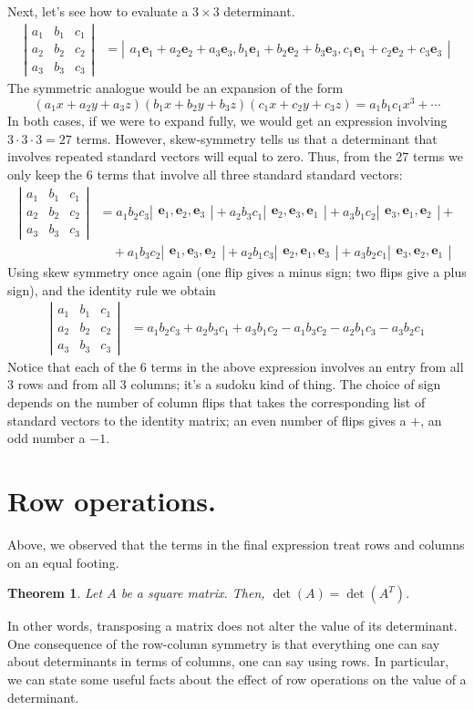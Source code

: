 \documentclass[12pt]{article}
\newcommand{\be}{\mathbf{e}}
\newcommand{\vmat}[1]{\left|\begin{matrix}#1\end{matrix}\right|}
\newtheorem{theorem}{Theorem}
\begin{document}
Next, let's see how to evaluate a $3\times 3$ determinant.
\begin{align*}
  \vmat{ a_1 & b_1 & c_1 \\
    a_2 & b_2 & c_2 \\
    a_3 & b_3 & c_3 } &=
  \vmat{ a_1 \be_1 + a_2 \be_2 + a_3 \be_3, b_1 \be_1 + b_2 \be_2 + b_3
  \be_3, c_1 \be_1 + c_2 \be_2 + c_3 \be_3 } 
\end{align*}
The symmetric analogue would be an expansion of the form
\[ ( a_1 x + a_2 y + a_3 z)(b_1 x + b_2 y + b_3 z)(c_1 x + c_2 y + c_3
z ) = a_1 b_1 c_1 x^3 + \cdots \] In both cases, if we were to expand
fully, we would get an expression involving $3\cdot 3\cdot 3=27$
terms.  However, skew-symmetry tells us that a determinant that
involves repeated standard vectors will equal to zero.  Thus, from the
27 terms we only keep the 6 terms that involve all three standard
standard vectors:
\begin{align*}
  \vmat{ a_1 & b_1 & c_1 \\
    a_2 & b_2 & c_2 \\
    a_3 & b_3 & c_3 } &=
  a_1 b_2 c_3 \vmat{\be_1,\be_2,\be_3} + a_2 b_3 c_1
  \vmat{\be_2,\be_3,\be_1} + a_3 b_1 c_2 \vmat{\be_3,\be_1,\be_2} + \\
  &\quad + a_1 b_3 c_2 \vmat{\be_1, \be_3, \be_2} + a_2 b_1 c_3
  \vmat{\be_2,\be_1, \be_3} + a_3 b_2 c_1 \vmat{\be_3, \be_2, \be_1}
\end{align*}
Using skew symmetry once again (one flip gives a minus sign; two flips
give a plus sign), and the identity rule we obtain
\begin{align*}
  \vmat{ a_1 & b_1 & c_1 \\
    a_2 & b_2 & c_2 \\
    a_3 & b_3 & c_3 } &= a_1 b_2 c_3 + a_2 b_3 c_1 + a_3 b_1 c_2 - a_1
  b_3 c_2 - a_2 b_1 c_3- a_3 b_2 c_1
\end{align*}
Notice that each of the 6 terms in the above expression involves an
entry from all 3 rows and from all 3 columns; it's a sudoku kind of
thing.  The choice of sign depends on the number of column flips
that takes the corresponding list of standard vectors to the identity
matrix; an even number of flips gives a $+$, an odd number a $-1$.

\section{Row operations.}
Above, we observed that the terms in the final expression treat rows
and columns on an equal footing.  
\begin{theorem}
  Let $A$ be a square matrix.  Then, $\det(A) = \det(A^T)$.
\end{theorem}
\noindent
In other words, transposing a matrix does not alter the value of its
determinant.  One consequence of the row-column symmetry is that
everything one can say about determinants in terms of columns, one can
say using rows.  In particular, we can state some useful facts about
the effect of row operations on the value of a determinant.
\end{document}

